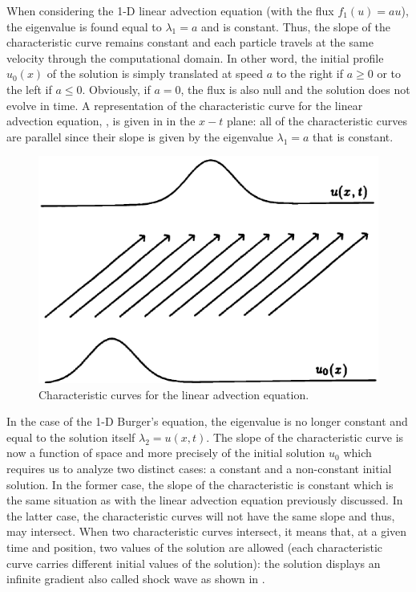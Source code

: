 When considering the 1-D linear advection equation (with the flux $f_1(u) = au$), the eigenvalue is found equal to $\lambda_1=a$ and is constant. Thus, the slope of the characteristic curve remains constant and each particle travels at the same velocity through the computational domain. In other word, the initial profile $u_0(x)$ of the solution is simply translated at speed $a$ to the right if $a \geq 0$ or to the left if $a \leq 0$. Obviously, if $a=0$, the flux is also null and the solution does not evolve in time. A representation of the characteristic curve for the linear advection equation, , is given in  in the $x-t$ plane: all of the characteristic curves are parallel since their slope is given by the eigenvalue $\lambda_1=a$ that is constant.
%
\begin{figure}[H]
\centering
\includegraphics[width=\textwidth]{figures/charact_curves_linear_transport.png}
\caption{Characteristic curves for the linear advection equation.}
\label{fig:char_curve_sct1b}
\end{figure}
%
In the case of the 1-D Burger's equation, the eigenvalue is no longer constant and equal to the solution itself $\lambda_2 = u(x,t)$. The slope of the characteristic curve is now a function of space and more precisely of the initial solution $u_0$ which requires us to analyze two distinct cases: a constant and a non-constant initial solution. In the former case, the slope of the characteristic is constant which is the same situation as with the linear advection equation previously discussed. In the latter case, the characteristic curves will not have the same slope and thus, may intersect. When two characteristic curves intersect, it means that, at a given time and position, two values of the solution are allowed (each characteristic curve carries different initial values of the solution): the solution displays an infinite gradient also called shock wave as shown in . 

